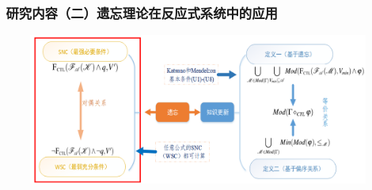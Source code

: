 \documentclass[aspectratio=1610, 9pt, CJK]{beamer}
\begin{document}
\begin{frame}
\frametitle{~研究内容（二）遗忘理论在反应式系统中的应用}
\begin{figure} 
	\includegraphics[scale=0.4]{figures/sncAndWsc11}
\end{figure} 
\end{frame}
\end{document}
